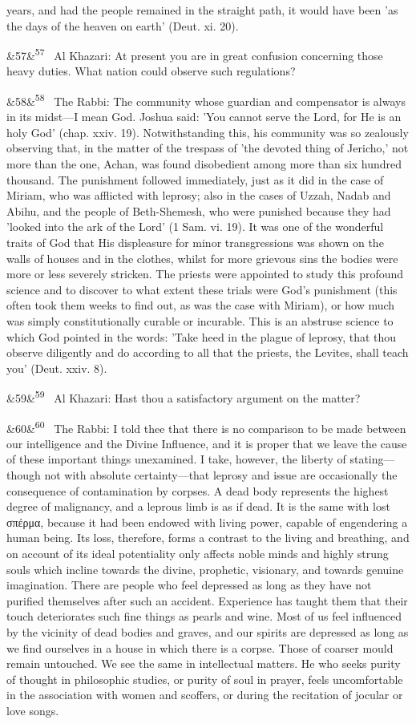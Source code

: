 \documentclass[12pt]{article}
\newcommand{\para}[1][]{\par\noindent\ifx&#1&\else\textsuperscript{\footnotesize #1}~\fi}
\begin{document}
years, and had the people remained in the straight path, it would have been 'as the days of the heaven on earth' (Deut. xi. 20).

\para[57] Al Khazari: At present you are in great confusion concerning those heavy duties. What nation could observe such regulations?

\para[58] The Rabbi: The community whose guardian and compensator is always in its midst---I mean God. Joshua said: 'You cannot serve the Lord, for He is an holy God' (chap. xxiv. 19). Notwithstanding this, his community was so zealously observing that, in the matter of the trespass of 'the devoted thing of Jericho,' not more than the one, Achan, was found disobedient among more than six hundred thousand. The punishment followed immediately, just as it did in the case of Miriam, who was afflicted with leprosy; also in the cases of Uzzah, Nadab and Abihu, and the people of Beth-Shemesh, who were punished because they had 'looked into the ark of the Lord' (1 Sam. vi. 19). It was one of the wonderful traits of God that His displeasure for minor transgressions was shown on the walls of houses and in the clothes, whilst for more grievous sins the bodies were more or less severely stricken. The priests were appointed to study this profound science and to discover to what extent these trials were God's punishment (this often took them weeks to find out, as was the case with Miriam), or how much was simply constitutionally curable or incurable. This is an abstruse science to which God pointed in the words: 'Take heed in the plague of leprosy, that thou observe diligently and do according to all that the priests, the Levites, shall teach you' (Deut. xxiv. 8).

\para[59] Al Khazari: Hast thou a satisfactory argument on the matter?

\para[60] The Rabbi: I told thee that there is no comparison to be made between our intelligence and the Divine Influence, and it is proper that we leave the cause of these important things unexamined. I take, however, the liberty of stating---though not with absolute certainty---that leprosy and issue are occasionally the consequence of contamination by corpses. A dead body represents the highest degree of malignancy, and a leprous limb is as if dead. It is the same with lost σπέρμα, because it had been endowed with living power, capable of engendering a human being. Its loss, therefore, forms a contrast to the living and breathing, and on account of its ideal potentiality only affects noble minds and highly strung souls which incline towards the divine, prophetic, visionary, and towards genuine imagination. There are people who feel depressed as long as they have not purified themselves after such an accident. Experience has taught them that their touch deteriorates such fine things as pearls and wine. Most of us feel influenced by the vicinity of dead bodies and graves, and our spirits are depressed as long as we find ourselves in a house in which there is a corpse. Those of coarser mould remain untouched. We see the same in intellectual matters. He who seeks purity of thought in philosophic studies, or purity of soul in prayer, feels uncomfortable in the association with women and scoffers, or during the recitation of jocular or love songs.
\end{document}
